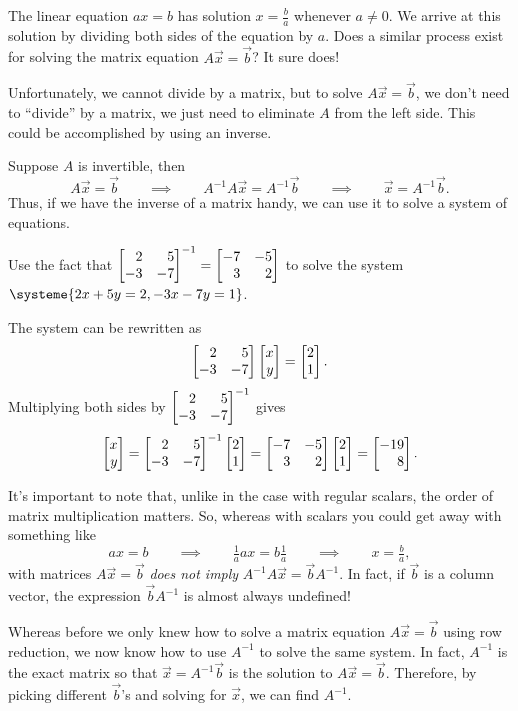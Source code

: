 
The linear equation $ax=b$ has solution $x=\frac{b}{a}$ whenever $a\neq 0$.  We arrive at this solution by
dividing both sides of the equation by $a$. Does a similar process exist for solving the matrix equation $A\vec x=\vec b$? It
sure does!

Unfortunately, we cannot divide by a matrix, but to solve $A\vec x=\vec b$, we don't need to ``divide'' by a matrix, we just need to
eliminate $A$ from the left side. This could be accomplished by using an inverse.

Suppose $A$ is invertible, then
\[
	A\vec x=\vec b\qquad\implies\qquad A^{-1}A\vec x=A^{-1}\vec b\qquad\implies\qquad \vec x=A^{-1}\vec b.
\]
Thus, if we have the inverse of a matrix handy, we can use it to solve a system of equations.

\begin{example}
	Use the fact that $\mat{2&5\\-3&-7}^{-1}=\mat{-7&-5\\3&2}$ to solve the system $\systeme{2x+5y=2,-3x-7y=1}$.

	The system can be rewritten as
	\[
	    \mat{2&5\\-3&-7}\mat{x\\y}=\mat{2\\1}.
	\]
	Multiplying both sides by $\mat{2&5\\-3&-7}^{-1}$ gives 
	\[
	    \mat{x\\y}=\mat{2&5\\-3&-7}^{-1}\mat{2\\1}=\mat{-7&-5\\3&2}\mat{2\\1}=\mat{-19\\8}.
	\]
\end{example}

It's important to note that, unlike in the case with regular scalars, the order of matrix multiplication matters.
So, whereas with scalars you could get away with something like
\[
	ax=b \qquad\implies \qquad \tfrac{1}{a}ax=b\tfrac{1}{a}\qquad\implies \qquad x=\tfrac{b}{a},
\]
with matrices $A\vec x=\vec b$ \emph{does not imply} $A^{-1}A\vec x=\vec b A^{-1}$. In fact, if $\vec b$ is a column
vector, the expression $\vec bA^{-1}$ is almost always undefined!

Whereas before we only knew how to solve a matrix equation $A\vec x=\vec b$ using row reduction, we now
know how to use $A^{-1}$ to solve the same system. In fact, $A^{-1}$ is the exact matrix so that $\vec x=A^{-1}\vec b$
is the solution to $A\vec x=\vec b$. Therefore, by picking different $\vec b$'s and solving for $\vec x$, we
can find $A^{-1}$.

